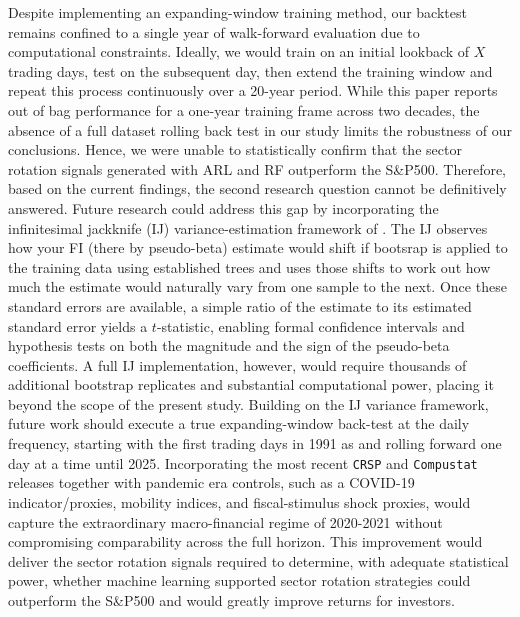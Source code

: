 Despite implementing an expanding-window training method, our backtest remains confined to a single year of walk-forward evaluation due to computational constraints. Ideally, we would train on an initial lookback of $X$ trading days, test on the subsequent day, then extend the training window and repeat this process continuously over a 20-year period. While this paper reports out of bag performance for a one-year training frame across two decades, the absence of a full dataset rolling back test in our study limits the robustness of our conclusions. Hence, we were unable to statistically confirm that the sector rotation signals generated with ARL and RF outperform the S\&P500. Therefore, based on the current findings, the second research question cannot be definitively answered. Future research could address this gap by incorporating the infinitesimal jackknife (IJ) variance-estimation framework of . The IJ observes how your FI (there by pseudo-beta) estimate would shift if bootsrap is applied to the training data using established trees and uses those shifts to work out how much the estimate would naturally vary from one sample to the next.  Once these standard errors are available, a simple ratio of the estimate to its estimated standard error yields a $t$-statistic, enabling formal confidence intervals and hypothesis tests on both the magnitude and the sign of the pseudo-beta coefficients. A full IJ implementation, however, would require thousands of additional bootstrap replicates and substantial computational power, placing it beyond the scope of the present study. Building on the IJ variance framework, future work should execute a true expanding-window back-test at the daily frequency, starting with the first trading days in 1991 as  and rolling forward one day at a time until 2025. Incorporating the most recent \texttt{CRSP} and \texttt{Compustat} releases together with pandemic era controls, such as a COVID-19 indicator/proxies, mobility indices, and fiscal-stimulus shock proxies, would capture the extraordinary macro-financial regime of 2020-2021 without compromising comparability across the full horizon. This improvement would deliver the sector rotation signals required to determine, with adequate statistical power, whether machine learning supported sector rotation strategies could outperform the S\&P500 and would greatly improve returns for investors.